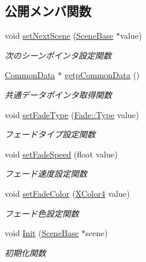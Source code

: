 \subsection*{公開メンバ関数}
\begin{DoxyCompactItemize}
\item 
void \mbox{\hyperlink{class_scene_manager_a208cc1690dcb260ae7fb94d13118f6ce}{set\+Next\+Scene}} (\mbox{\hyperlink{class_scene_base}{Scene\+Base}} $\ast$value)
\begin{DoxyCompactList}\small\item\em 次のシーンポインタ設定関数 \end{DoxyCompactList}\item 
\mbox{\hyperlink{class_scene_manager_1_1_common_data}{Common\+Data}} $\ast$ \mbox{\hyperlink{class_scene_manager_a4de42577d81672dee3e79300e745553c}{getp\+Common\+Data}} ()
\begin{DoxyCompactList}\small\item\em 共通データポインタ取得関数 \end{DoxyCompactList}\item 
void \mbox{\hyperlink{class_scene_manager_a95bb32ee4d3461bf56381d288a98c61b}{set\+Fade\+Type}} (\mbox{\hyperlink{class_fade_ac06f27215b454aa05b93c236476d6e80}{Fade\+::\+Type}} value)
\begin{DoxyCompactList}\small\item\em フェードタイプ設定関数 \end{DoxyCompactList}\item 
void \mbox{\hyperlink{class_scene_manager_af3b87ef963b80aa1942a2f804f61bdeb}{set\+Fade\+Speed}} (float value)
\begin{DoxyCompactList}\small\item\em フェード速度設定関数 \end{DoxyCompactList}\item 
void \mbox{\hyperlink{class_scene_manager_a24e7fa08c34ecacdca37ee35c5c39141}{set\+Fade\+Color}} (\mbox{\hyperlink{_vector3_d_8h_a680c30c4a07d86fe763c7e01169cd6cc}{X\+Color4}} value)
\begin{DoxyCompactList}\small\item\em フェード色設定関数 \end{DoxyCompactList}\item 
void \mbox{\hyperlink{class_scene_manager_a3d14c04a921c6c670e89fbf22a719b00}{Init}} (\mbox{\hyperlink{class_scene_base}{Scene\+Base}} $\ast$scene)
\begin{DoxyCompactList}\small\item\em 初期化関数 \end{DoxyCompactList}\item 

\end{DoxyCompactItemize}
